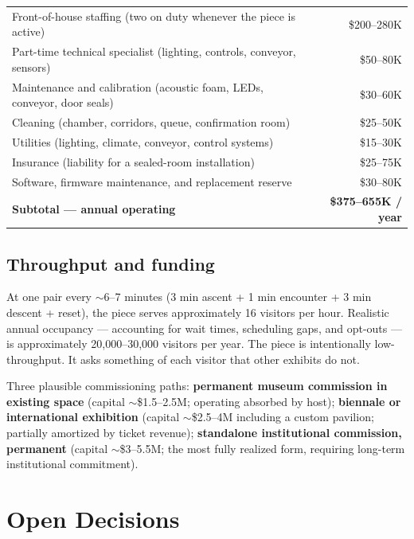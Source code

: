 \documentclass[]{anvil-installation}
\begin{document}
\begin{metricbox}
\begin{tabularx}{\textwidth}{@{} X r @{}}
Front-of-house staffing (two on duty whenever the piece is active) & \$200--280K \\
Part-time technical specialist (lighting, controls, conveyor, sensors) & \$50--80K \\
Maintenance and calibration (acoustic foam, LEDs, conveyor, door seals) & \$30--60K \\
Cleaning (chamber, corridors, queue, confirmation room) & \$25--50K \\
Utilities (lighting, climate, conveyor, control systems) & \$15--30K \\
Insurance (liability for a sealed-room installation) & \$25--75K \\
Software, firmware maintenance, and replacement reserve & \$30--80K \\
\midrule
\textbf{Subtotal --- annual operating} & \textbf{\$375--655K / year} \\
\end{tabularx}
\end{metricbox}

\subsection{Throughput and funding}

At one pair every $\sim$6--7 minutes (3 min ascent + 1 min encounter + 3 min descent + reset), the piece serves approximately 16 visitors per hour. Realistic annual occupancy --- accounting for wait times, scheduling gaps, and opt-outs --- is approximately 20{,}000--30{,}000 visitors per year. The piece is intentionally low-throughput. It asks something of each visitor that other exhibits do not.

Three plausible commissioning paths: \textbf{permanent museum commission in existing space} (capital $\sim$\$1.5--2.5M; operating absorbed by host); \textbf{biennale or international exhibition} (capital $\sim$\$2.5--4M including a custom pavilion; partially amortized by ticket revenue); \textbf{standalone institutional commission, permanent} (capital $\sim$\$3--5.5M; the most fully realized form, requiring long-term institutional commitment).

\section{Open Decisions}
\end{document}
